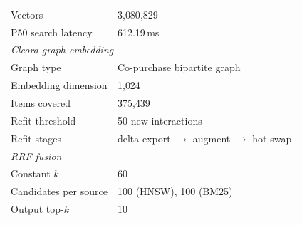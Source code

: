\begin{longtable}{p{5.5cm} p{7.5cm}}
Vectors                 & 3{,}080{,}829 \\
P50 search latency      & 612.19\,ms \\
\hline
\multicolumn{2}{l}{\textit{Cleora graph embedding}} \\
Graph type              & Co-purchase bipartite graph \\
Embedding dimension     & 1{,}024 \\
Items covered           & 375{,}439 \\
Refit threshold         & 50 new interactions \\
Refit stages            & delta export $\to$ augment $\to$ hot-swap \\
\hline
\multicolumn{2}{l}{\textit{RRF fusion}} \\
Constant $k$            & 60 \\
Candidates per source   & 100 (HNSW), 100 (BM25) \\
Output top-$k$          & 10 \\

\end{longtable}
